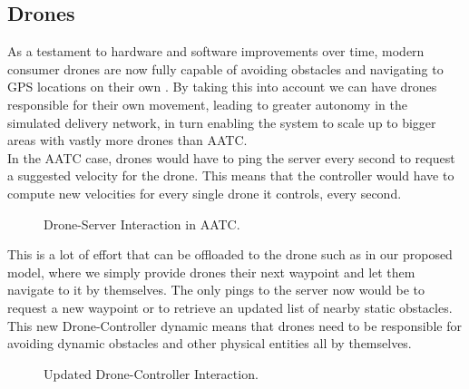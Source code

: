 \documentclass[a4paper,11pt,titlepage]{report}
\begin{document}
\subsection{Drones}
As a testament to hardware and software improvements over time, modern consumer drones are now fully capable of avoiding obstacles \cite{DJI} and navigating to GPS locations on their own \cite{DJIb}. By taking this into account we can have drones responsible for their own movement, leading to greater autonomy in the simulated delivery network, in turn enabling the system to scale up to bigger areas with vastly more drones than AATC.\\

In the AATC case, drones would have to ping the server every second to request a suggested velocity for the drone. This means that the controller would have to compute new velocities for every single drone it controls, every second.

\begin{figure}[!hbpt]
 \centering
 \caption{Drone-Server Interaction in AATC.}
 \end{figure}

This is a lot of effort that can be offloaded to the drone such as in our proposed model, where we simply provide drones their next waypoint and let them navigate to it by themselves. The only pings to the server now would be to request a new waypoint or to retrieve an updated list of nearby static obstacles.\\

This new Drone-Controller dynamic means that drones need to be responsible for avoiding dynamic obstacles and other physical entities all by themselves.

 \begin{figure}[!hbpt]
  \centering
  \caption{Updated Drone-Controller Interaction.}
  \end{figure}
\end{document}

